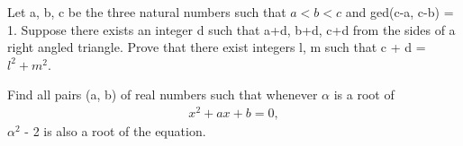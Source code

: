 \item Let a, b, c be the three natural numbers such that $a < b < c$ and ged(c-a, c-b) = 1. Suppose there exists an integer d such that a+d, b+d, c+d from the sides of a right angled triangle. Prove that there exist integers l, m such that 
c + d = $l^2 + m^2$.

\item Find all pairs (a, b) of real numbers such that whenever $\alpha$ is a root of
\begin{align} 
x^2 + ax + b = 0,
\end{align}
$\alpha^2$ - 2 is also a root of the equation.

